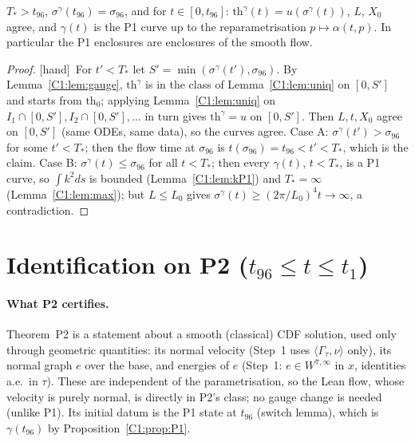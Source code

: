 \documentclass[11pt]{article}
\newcommand{\tH}{\textup{[hand]}}\newcommand{\tS}{\textup{[sym]}}\newcommand{\tC}{\textup{[cert]}}\newcommand{\tI}{\textup{[cited]}}\newcommand{\tN}{\textup{[num]}}\newcommand{\tL}{\textup{[Lean]}}
\newcommand{\ip}[2]{\langle#1,#2\rangle}
\begin{document}
\begin{proposition}[identification on P1]\label{C1:prop:P1}
$T_*>t_{96}$, $\sigma^\gamma(t_{96})=\sigma_{96}$, and for $t\in[0,t_{96}]$: $\mathrm{th}^\gamma(t)=u(\sigma^\gamma(t))$, $L$, $X_0$ agree, and $\gamma(t)$ is the P1 curve up to the reparametrisation $p\mapsto\alpha(t,p)$. In particular the P1 enclosures are enclosures of the smooth flow.
\end{proposition}
\begin{proof}\tH\ For $t'<T_*$ let $S'=\min(\sigma^\gamma(t'),\sigma_{96})$. By Lemma~\ref{C1:lem:gauge}, $\mathrm{th}^\gamma$ is in the class of Lemma~\ref{C1:lem:uniq} on $[0,S']$ and starts from $\mathrm{th}_0$; applying Lemma~\ref{C1:lem:uniq} on $I_1\cap[0,S'],I_2\cap[0,S'],\dots$ in turn gives $\mathrm{th}^\gamma=u$ on $[0,S']$. Then $L,t,X_0$ agree on $[0,S']$ (same ODEs, same data), so the curves agree. Case A: $\sigma^\gamma(t')>\sigma_{96}$ for some $t'<T_*$; then the flow time at $\sigma_{96}$ is $t(\sigma_{96})=t_{96}<t'<T_*$, which is the claim. Case B: $\sigma^\gamma(t)\le\sigma_{96}$ for all $t<T_*$; then every $\gamma(t)$, $t<T_*$, is a P1 curve, so $\int k^2ds$ is bounded (Lemma~\ref{C1:lem:kP1}) and $T_*=\infty$ (Lemma~\ref{C1:lem:max}); but $L\le L_0$ gives $\sigma^\gamma(t)\ge(2\pi/L_0)^4t\to\infty$, a contradiction.
\end{proof}

\section{Identification on P2 ($t_{96}\le t\le t_1$)}
\paragraph{What P2 certifies.} Theorem~P2 is a statement about a smooth (classical) CDF solution, used only through geometric quantities: its normal velocity (Step~1 uses $\ip{\Gamma_\tau}{\nu}$ only), its normal graph $e$ over the base, and energies of $e$ (Step~1: $e\in W^{7,\infty}$ in $x$, identities a.e.\ in $\tau$). These are independent of the parametrisation, so the Lean flow, whose velocity is purely normal, is directly in P2's class; no gauge change is needed (unlike P1). Its initial datum is the P1 state at $t_{96}$ (switch lemma), which is $\gamma(t_{96})$ by Proposition~\ref{C1:prop:P1}.
\end{document}
